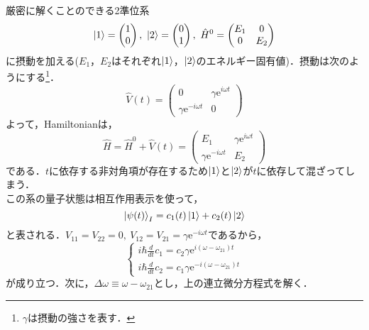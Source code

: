 \documentclass{standalone}
\begin{document}
  厳密に解くことのできる2準位系
  \begin{equation}
    \ket{1}=\begin{pmatrix}
      1\\
      0
    \end{pmatrix},\ 
    \ket{2}=\begin{pmatrix}
      0\\
      1
    \end{pmatrix},\ 
    \hat{H}^0=\begin{pmatrix}
      E_1 & 0\\
      0 & E_2
    \end{pmatrix}
  \end{equation}
  に摂動を加える($E_1$，$E_2$はそれぞれ$\ket{1}$，$\ket{2}$のエネルギー固有値)．摂動は次のようにする\footnote{$\gamma$は摂動の強さを表す．}．
  \begin{equation}
    \hat{V}(t)=\begin{pmatrix}
      0& \gamma\mathrm{e}^{i\omega t}\\
      \gamma \mathrm{e}^{-i\omega t}&0
    \end{pmatrix}
  \end{equation}
  よって，Hamiltonianは，
  \begin{equation}
    \hat{H}=\hat{H}^0+\hat{V}(t)=\begin{pmatrix}
      E_1&\gamma\mathrm{e}^{i\omega t}\\
      \gamma\mathrm{e}^{-i\omega t}&E_2
    \end{pmatrix}
  \end{equation}
  である．$t$に依存する非対角項が存在するため$\ket{1}$と$\ket{2}$が$t$に依存して混ざってしまう．\\
  この系の量子状態は相互作用表示を使って，
  \begin{equation}
    \ket{\psi(t)}_I=c_1(t)\ket{1}+c_2(t)\ket{2}
  \end{equation}
  と表される．$V_{11}=V_{22}=0,\ V_{12}=V_{21}=\gamma\mathrm{e}^{-i\omega t}$であるから，
  \begin{equation}
    \begin{cases}
      i\hbar\frac{d}{dt}c_1=c_2\gamma\mathrm{e}^{i(\omega-\omega_{21})t}\\
      i\hbar\frac{d}{dt}c_2=c_1\gamma\mathrm{e}^{-i(\omega-\omega_{21})t}
    \end{cases}
  \end{equation}
  が成り立つ．次に，$\Delta\omega\equiv\omega-\omega_{21}$とし，上の連立微分方程式を解く．\\
\end{document}
